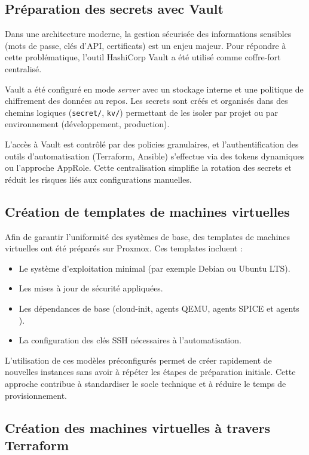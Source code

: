 \subsection{Préparation des secrets avec Vault}

Dans une architecture moderne, la gestion sécurisée des informations sensibles (mots de passe, clés d'API, certificats) est un enjeu majeur.
Pour répondre à cette problématique, l'outil HashiCorp Vault a été utilisé comme coffre-fort centralisé.

Vault a été configuré en mode \textit{server} avec un stockage interne et une politique de chiffrement des données au repos. Les secrets sont créés et organisés dans des chemins logiques (\texttt{secret/}, \texttt{kv/}) permettant de les isoler par projet ou par environnement (développement, production).

L'accès à Vault est contrôlé par des policies granulaires, et l'authentification des outils d'automatisation (Terraform, Ansible) s'effectue via des tokens dynamiques ou l'approche AppRole.
Cette centralisation simplifie la rotation des secrets et réduit les risques liés aux configurations manuelles.

\subsection{Création de templates de machines virtuelles}

Afin de garantir l'uniformité des systèmes de base, des templates de machines virtuelles ont été préparés sur Proxmox.
Ces templates incluent :
\begin{itemize}
	\item Le système d'exploitation minimal (par exemple Debian ou Ubuntu LTS).
	\item Les mises à jour de sécurité appliquées.
	\item Les dépendances de base (cloud-init, agents QEMU, agents SPICE et agents ).
	\item La configuration des clés SSH nécessaires à l'automatisation.
\end{itemize}

L'utilisation de ces modèles préconfigurés permet de créer rapidement de nouvelles instances sans avoir à répéter les étapes de préparation initiale.
Cette approche contribue à standardiser le socle technique et à réduire le temps de provisionnement.

\subsection{Création des machines virtuelles à travers Terraform}

